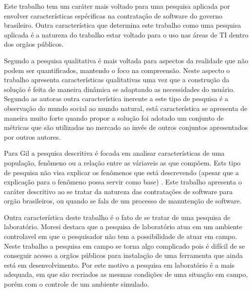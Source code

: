 Este trabalho tem um caráter mais voltado para uma pesquisa aplicada por envolver características espécificas na contratação de software do governo brasileiro. Outra característica que determina este trabalho como uma pesquisa aplicada é a natureza do trabalho estar voltado para o uso nas áreas de TI dentro dos orgãos públicos.

Segundo \cite{tatiana_denise} a pesquisa qualitativa é mais voltada para aspectos da realidade que não podem ser quantificados, mantendo o foco na compreensão. Neste aspecto o trabalho apresenta características qualitativas uma vez que a construção da solução é feita de maneira dinâmica se adaptando as necessidades do usuário. Segundo as autoras outra característica inerente a este tipo de pesquisa é a observação do mundo social ao mundo natural, está característica se apresenta de maneira muito forte quando propor a solução foi adotado um conjunto de métricas que são utilizadas no mercado ao invés de outros conjuntos apresentados por outros autores. 

Para Gil \cite{gil_como_2002} a pesquisa descritiva é focada em analisar características de uma população, fenômeno ou a relação entre as váriaveis as que compõem. Ests tipo de pesquisa não visa explicar os fenômenos que está descrevendo (apesar que a explicação para o fenômeno possa servir como base) \cite{moresi_metodologia_2003}. Este trabalho apresenta o caráter descritivo ao se tratar da natureza das contratações de software para orgão brasileiros, ou quando se fala de um processo de manutenção de software.

Outra característica deste trabalho é o fato de se tratar de uma pesquisa 	de laboratório. Moresi destaca que a pesquisa de laboratório atua em um ambiente controlavel em que o pesquisador não tem a possibilidade de atuar em campo. Neste trabalho a pesquisa em campo se torna algo complicado pois é difícil de se conseguir acesso a orgãos públicos para instalação de uma ferramenta que ainda está em desenvolvimento. Por este motivo a pesquisa em laboratório é a mais adequada, em que são recriados as mesmas condições de uma situação em campo, porém com o controle de um ambiente simulado.

